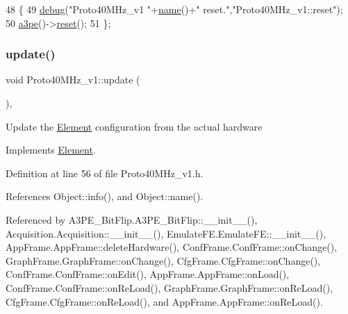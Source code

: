 \begin{DoxyCode}
48                \{
49     \hyperlink{classObject_aac010553f022165573714b7014a15f0d}{debug}(\textcolor{stringliteral}{"Proto40MHz\_v1 "}+\hyperlink{classObject_a300f4c05dd468c7bb8b3c968868443c1}{name}()+\textcolor{stringliteral}{" reset."},\textcolor{stringliteral}{"Proto40MHz\_v1::reset"});
50     \hyperlink{classProto40MHz__v1_a263cfc900aafa3ceee1af4b596a824de}{a3pe}()->\hyperlink{classA3PE_a449775588222d544aeeaab190d553652}{reset}();
51   \};
\end{DoxyCode}
\mbox{\label{classProto40MHz__v1_a862d752dfe341ad00eea6f9d8dbc8525}} 
\subsubsection{\texorpdfstring{update()}{update()}}
{\footnotesize\ttfamily void Proto40\+M\+Hz\+\_\+v1\+::update (\begin{DoxyParamCaption}{ }\end{DoxyParamCaption})\hspace{0.3cm}{\ttfamily [inline]}, {\ttfamily [virtual]}}

Update the \hyperlink{classElement}{Element} configuration from the actual hardware 

Implements \hyperlink{classElement_a4e6c83efae95616ebddd03c793a26661}{Element}.



Definition at line 56 of file Proto40\+M\+Hz\+\_\+v1.\+h.



References Object\+::info(), and Object\+::name().



Referenced by A3\+P\+E\+\_\+\+Bit\+Flip.\+A3\+P\+E\+\_\+\+Bit\+Flip\+::\+\_\+\+\_\+init\+\_\+\+\_\+(), Acquisition.\+Acquisition\+::\+\_\+\+\_\+init\+\_\+\+\_\+(), Emulate\+F\+E.\+Emulate\+F\+E\+::\+\_\+\+\_\+init\+\_\+\+\_\+(), App\+Frame.\+App\+Frame\+::delete\+Hardware(), Conf\+Frame.\+Conf\+Frame\+::on\+Change(), Graph\+Frame.\+Graph\+Frame\+::on\+Change(), Cfg\+Frame.\+Cfg\+Frame\+::on\+Change(), Conf\+Frame.\+Conf\+Frame\+::on\+Edit(), App\+Frame.\+App\+Frame\+::on\+Load(), Conf\+Frame.\+Conf\+Frame\+::on\+Re\+Load(), Graph\+Frame.\+Graph\+Frame\+::on\+Re\+Load(), Cfg\+Frame.\+Cfg\+Frame\+::on\+Re\+Load(), and App\+Frame.\+App\+Frame\+::on\+Re\+Load().



